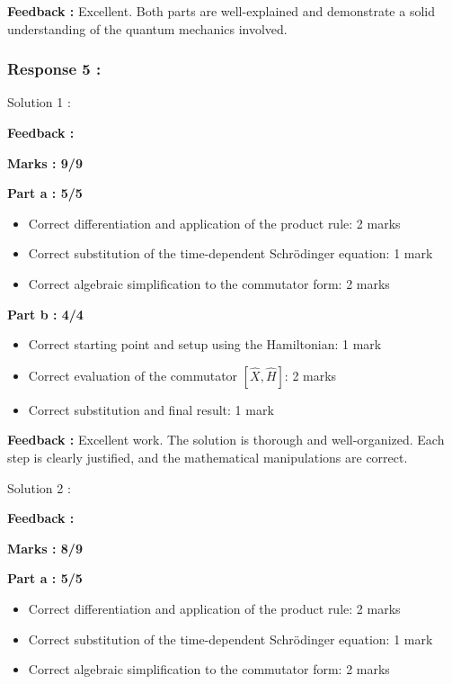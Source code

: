 \documentclass[a4paper,11pt]{article}
\begin{document}
\textbf{Feedback :}
Excellent. Both parts are well-explained and demonstrate a solid understanding of the quantum mechanics involved.


\subsubsection*{Response 5 :}


Solution 1 :

\textbf{Feedback :}

\textbf{Marks : 9/9}

\textbf{Part a : 5/5}

\begin{itemize}
    \item Correct differentiation and application of the product rule: 2 marks
    \item Correct substitution of the time-dependent Schrödinger equation: 1 mark
    \item Correct algebraic simplification to the commutator form: 2 marks
\end{itemize}


\textbf{Part b : 4/4}

\begin{itemize}
    \item Correct starting point and setup using the Hamiltonian: 1 mark
    \item Correct evaluation of the commutator $[\hat{X}, \hat{H}]$: 2 marks
    \item Correct substitution and final result: 1 mark
\end{itemize}

\textbf{Feedback :}
Excellent work. The solution is thorough and well-organized. Each step is clearly justified, and the mathematical manipulations are correct.



Solution 2 :

\textbf{Feedback :}

\textbf{Marks : 8/9}

\textbf{Part a : 5/5}

\begin{itemize}
    \item Correct differentiation and application of the product rule: 2 marks
    \item Correct substitution of the time-dependent Schrödinger equation: 1 mark
    \item Correct algebraic simplification to the commutator form: 2 marks
\end{itemize}
\end{document}
